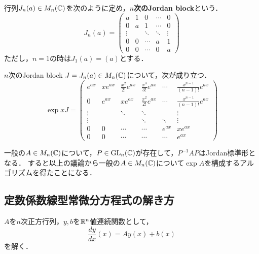 \documentclass[uplatex,dvipdfmx]{jsreport}
\begin{document}
\begin{definition}
    行列$J_n(a)\in M_n(\mathbb{C})$を次のように定め，\textbf{$n$次のJordan block}という．
    \[ J_n(a) = \begin{pmatrix}a&1&0&\cdots&0\\0&a&1&\cdots&0\\\vdots&&\ddots&\ddots&\vdots\\0&0&\cdots&a&1\\0&0&\cdots&0&a\end{pmatrix} \]
    ただし，$n=1$の時は$J_1(a)=(a)$とする．
\end{definition}
\begin{lemma}
    $n$次のJordan block $J=J_n(a)\in M_n(\mathbb{C})$について，次が成り立つ．
    \[\exp xJ=\begin{pmatrix}e^{ax}&xe^{ax}&\frac{x^2}{2!}e^{ax}&\frac{x^3}{3!}e^{ax}&\cdots&\frac{x^{n-1}}{(n-1)!}e^{ax} \\ 0&e^{ax}&xe^{ax}&\frac{x^2}{2!}e^{ax}&\cdots&\frac{x^{n-1}}{(n-1)!}e^{ax} \\ \vdots&&\ddots&\ddots&&\vdots \\ \vdots&&&\ddots&\ddots&\vdots \\ 0&0&\cdots&\cdots&e^{ax}&xe^{ax} \\ 0&0&\cdots&\cdots&\cdots&e^{ax}\end{pmatrix}\]
\end{lemma}
\begin{remark}
    一般の$A\in M_n(\mathbb{C})$について，$P\in\mathrm{GL}_n(\mathbb{C})$が存在して，$P^{-1}AP$はJordan標準形となる．
    すると以上の議論から一般の$A\in M_n(\mathbb{C})$について$\exp A$を構成するアルゴリズムを得たことになる．
\end{remark}

\subsection{定数係数線型常微分方程式の解き方}

$A$を$n$次正方行列，$y,b$を$\mathbb{R}^n$値連続関数として，
\[ \frac{dy}{dx}(x) = Ay(x)+b(x) \]
を解く．
\end{document}
